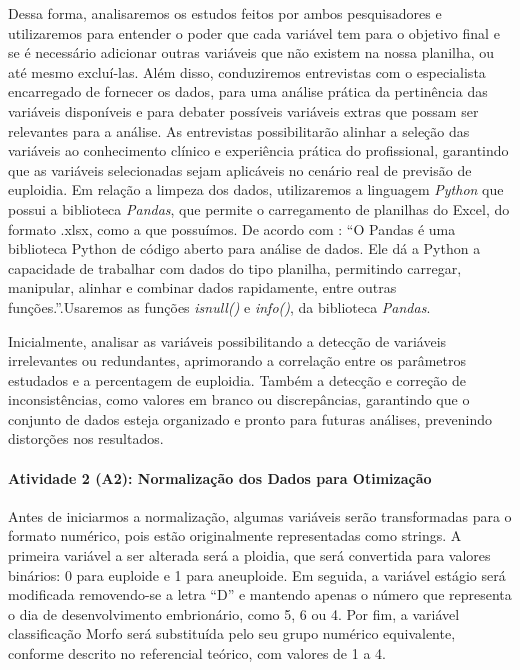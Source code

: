 Dessa forma, analisaremos os estudos feitos por ambos pesquisadores e utilizaremos para entender o poder que cada variável tem para o objetivo final e se é necessário adicionar outras variáveis que não existem na nossa planilha, ou até mesmo excluí-las. Além disso, conduziremos entrevistas com o especialista encarregado de fornecer os dados, para uma análise prática da pertinência das variáveis disponíveis e para debater possíveis variáveis extras que possam ser relevantes para a análise. As entrevistas possibilitarão alinhar a seleção das variáveis ao conhecimento clínico e experiência prática do profissional, garantindo que as variáveis selecionadas sejam aplicáveis no cenário real de previsão de euploidia. Em relação a limpeza dos dados, utilizaremos a linguagem \textit{Python} que possui a biblioteca \textit{Pandas}, que permite o carregamento de planilhas do Excel, do formato .xlsx, como a que possuímos. De acordo com : “O Pandas é uma biblioteca Python de código aberto para análise de dados. Ele dá a Python a capacidade de trabalhar com dados do tipo planilha, permitindo carregar, manipular, alinhar e combinar dados rapidamente, entre outras funções.”.Usaremos as funções \textit{isnull()} e \textit{info()}, da biblioteca \textit{Pandas}.

Inicialmente, analisar as variáveis possibilitando a detecção de variáveis irrelevantes ou redundantes, aprimorando a correlação entre os parâmetros estudados e a percentagem de euploidia. Também a detecção e correção de inconsistências, como valores em branco ou discrepâncias, garantindo que o conjunto de dados esteja organizado e pronto para futuras análises, prevenindo distorções nos resultados. 

\paragraph{\textbf{Atividade 2 (A2):} Normalização dos Dados para Otimização}

Antes de iniciarmos a normalização, algumas variáveis serão transformadas para o formato numérico, pois estão originalmente representadas como strings. A primeira variável a ser alterada será a ploidia, que será convertida para valores binários: 0 para euploide e 1 para aneuploide. Em seguida, a variável estágio será modificada removendo-se a letra “D” e mantendo apenas o número que representa o dia de desenvolvimento embrionário, como 5, 6 ou 4. Por fim, a variável classificação Morfo será substituída pelo seu grupo numérico equivalente, conforme descrito no referencial teórico, com valores de 1 a 4.

